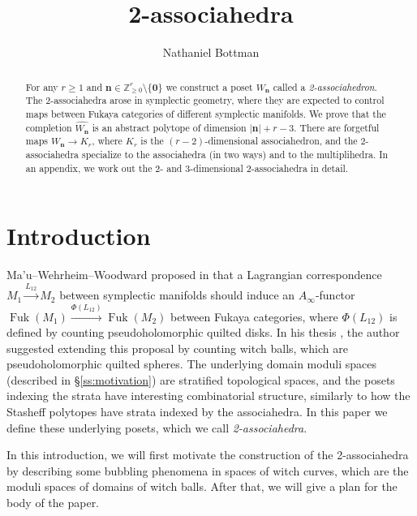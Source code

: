 \documentclass[11pt]{amsart}
\theoremstyle{definition}
\theoremstyle{remark}
\theoremstyle{plain}
\newcommand{\bZ}{\mathbb{Z}}
\newcommand\bn{\mathbf{n}}
\newcommand{\on}{\operatorname}
\newcommand{\Fuk}{\on{Fuk}}
\newcommand{\sr}{\stackrel}
\newcommand{\wh}{\widehat}
\def\lra{\longrightarrow}
\begin{document}
\title{2-associahedra}
\author{Nathaniel Bottman}
\address{School of Mathematics, Institute for Advanced Study,
1 Einstein Dr, Princeton, NJ 08540}

\maketitle

\begin{abstract}  
For any $r\geq 1$ and $\bn \in \bZ_{\geq0}^r \setminus \{\mathbf0\}$ we construct a poset $W_\bn$ called a \emph{2-associahedron}.
The 2-associahedra arose in symplectic geometry, where they are expected to control maps between Fukaya categories of different symplectic manifolds.
We prove that the completion $\wh{W_\bn}$ is an abstract polytope of dimension $|\bn|+r-3$.
There are forgetful maps $W_\bn \to K_r$, where $K_r$ is the $(r-2)$-dimensional associahedron, and the 2-associahedra specialize to the associahedra (in two ways) and to the multiplihedra.
In an appendix, we work out the 2- and 3-dimensional 2-associahedra in detail.
\end{abstract}

\setcounter{tocdepth}{1}
\tableofcontents

\section{Introduction}
\label{sec:intro}

Ma'u--Wehrheim--Woodward proposed in \cite{mww} that a Lagrangian correspondence $M_1 \sr{L_{12}}{\lra} M_2$ between symplectic manifolds should induce an $A_\infty$-functor $\Fuk(M_1) \sr{\Phi(L_{12})}{\lra} \Fuk(M_2)$ between Fukaya categories, where $\Phi(L_{12})$ is defined by counting pseudoholomorphic quilted disks.
In his thesis \cite{b:thesis}, the author suggested extending this proposal by counting witch balls, which are pseudoholomorphic quilted spheres.
The underlying domain moduli spaces (described in \S\ref{ss:motivation}) are stratified topological spaces, and the posets indexing the strata have interesting combinatorial structure, similarly to how the Stasheff polytopes have strata indexed by
the associahedra.
In this paper we define these underlying posets, which we call \emph{2-associahedra}.

In this introduction, we will first motivate the construction of the 2-associahedra by describing some bubbling phenomena in spaces of witch curves, which are the moduli spaces of domains of witch balls.
After that, we will give a plan for the body of the paper.
\end{document}
